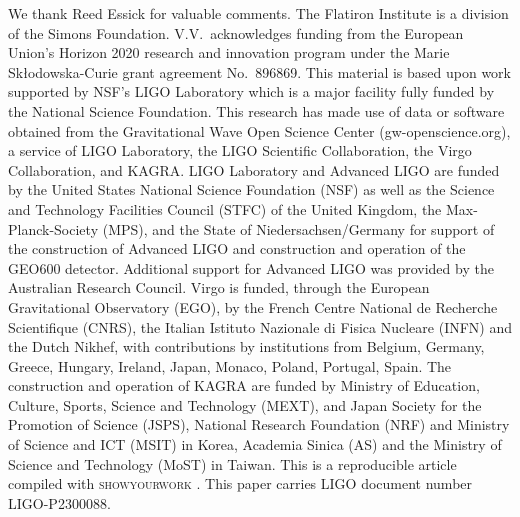 \documentclass[twocolumn,twocolappendix,linenumbers]{aastex631}
\newcommand{\dcc}{LIGO-P2300088}
\begin{document}
\begin{acknowledgments}
We thank Reed Essick for valuable comments.
The Flatiron Institute is a division of the Simons Foundation.
V.V.~acknowledges funding from the European Union's Horizon 2020 research and
innovation program under the Marie Skłodowska-Curie grant agreement No.~896869.
This material is based upon work supported by NSF's LIGO Laboratory which is a major facility fully funded by the National Science Foundation.
This research has made use of data or software obtained from the Gravitational Wave Open Science Center (gw-openscience.org), a service of LIGO Laboratory, the LIGO Scientific Collaboration, the Virgo Collaboration, and KAGRA. LIGO Laboratory and Advanced LIGO are funded by the United States National Science Foundation (NSF) as well as the Science and Technology Facilities Council (STFC) of the United Kingdom, the Max-Planck-Society (MPS), and the State of Niedersachsen/Germany for support of the construction of Advanced LIGO and construction and operation of the GEO600 detector. Additional support for Advanced LIGO was provided by the Australian Research Council. Virgo is funded, through the European Gravitational Observatory (EGO), by the French Centre National de Recherche Scientifique (CNRS), the Italian Istituto Nazionale di Fisica Nucleare (INFN) and the Dutch Nikhef, with contributions by institutions from Belgium, Germany, Greece, Hungary, Ireland, Japan, Monaco, Poland, Portugal, Spain. The construction and operation of KAGRA are funded by Ministry of Education, Culture, Sports, Science and Technology (MEXT), and Japan Society for the Promotion of Science (JSPS), National Research Foundation (NRF) and Ministry of Science and ICT (MSIT) in Korea, Academia Sinica (AS) and the Ministry of Science and Technology (MoST) in Taiwan.
This is a reproducible article compiled with \textsc{showyourwork} \citep{Luger2021}.
This paper carries LIGO document number \dcc{}.
\end{acknowledgments}





\appendix
\end{document}
